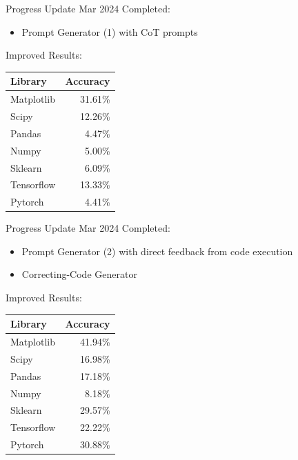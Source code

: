 \begin{frame}{Progress Update  Mar 2024}
    Completed:
    \begin{itemize}
        \item Prompt Generator (1) with CoT prompts
    \end{itemize}

    Improved Results:
    \begin{tabular}{lr}
        Library    & Accuracy \\
        \hline
        Matplotlib & 31.61\%  \\
        Scipy      & 12.26\%  \\
        Pandas     & 4.47\%   \\
        Numpy      & 5.00\%   \\
        Sklearn    & 6.09\%   \\
        Tensorflow & 13.33\%  \\
        Pytorch    & 4.41\%   \\
    \end{tabular}
\end{frame}

\begin{frame}{Progress Update  Mar 2024}
    Completed:
    \begin{itemize}
        \item Prompt Generator (2) with direct feedback from code execution
        \item Correcting-Code Generator
    \end{itemize}

    Improved Results:
    \begin{tabular}{lr}
        Library    & Accuracy \\
        \hline
        Matplotlib & 41.94\%  \\
        Scipy      & 16.98\%  \\
        Pandas     & 17.18\%  \\
        Numpy      & 8.18\%   \\
        Sklearn    & 29.57\%  \\
        Tensorflow & 22.22\%  \\
        Pytorch    & 30.88\%  \\
    \end{tabular}
\end{frame}
